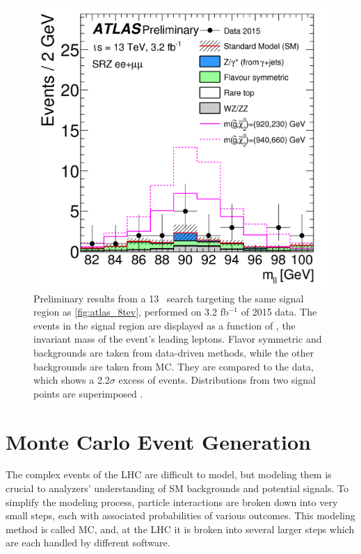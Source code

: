 \begin{centering}
\begin{figure}[!hbt]
\myfloatalign
\includegraphics[width=.9\linewidth]{figures/theory/fig_05.png}
\caption{ Preliminary results from a 13 \tev~search targeting the same signal region as \autoref{fig:atlas_8tev}, performed on 3.2 fb$^{-1}$ of 2015 data. The events in the signal region are displayed as a function of \mll, the invariant mass of the event's leading leptons. Flavor symmetric and \dyjets backgrounds are taken from data-driven methods, while the other backgrounds are taken from \ac{MC}. They are compared to the data, which shows a 2.2$\sigma$ excess of events. Distributions from two signal points are superimposed \cite{ATLAS-CONF-2015-082}.}
\label{fig:atlas_eoye}
\end{figure}
\end{centering}


\section{Monte Carlo Event Generation}
\label{sec:MC_gen}

The complex events of the \ac{LHC} are difficult to model, but modeling them is crucial to analyzers' understanding of \ac{SM} backgrounds and potential signals. To simplify the modeling process, particle interactions are broken down into very small steps, each with associated probabilities of various outcomes. This modeling method is called \acf{MC}, and, at the \ac{LHC} it is broken into several larger steps which are each handled by different software. 

